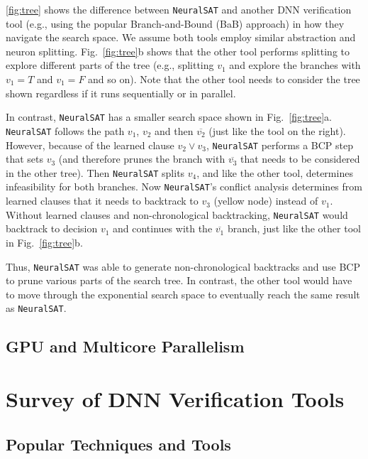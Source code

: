 \documentclass[oneside,11pt,dvipsnames]{book}
\numberwithin{equation}{section}
\theoremstyle{definition}
\theoremstyle{remark}
\newcommand{\tvn}[1]{\iftoggle{usecomment}{{\color{red}{[TVN]: #1}}}{}}
\newcommand{\hd}[1]{\iftoggle{usecomment}{{\color{blue}{[HD]: #1}}}{}}
\newcommand{\tool}{\texttt{NeuralSAT}}
\begin{document}

\autoref{fig:tree} shows the difference between \tool{} and another DNN verification tool (e.g., using the popular Branch-and-Bound (BaB) approach) in how they navigate the search space.  We assume both tools employ similar abstraction and neuron splitting.
Fig.~\ref{fig:tree}b shows that the other tool performs splitting to explore different parts of the tree (e.g., splitting $v_1$ and explore the branches with $v_1=T$ and $v_1=F$ and so on). Note that the other tool needs to consider the tree shown regardless if it runs sequentially or in parallel.

In contrast, \tool{} has a smaller search space shown in Fig.~\ref{fig:tree}a.
\tool{} follows the path $v_1$, $v_2$ and then $\overline{v_2}$ (just like the tool on the right).
However, because of the learned clause $v_2\lor v_3$, \tool{} performs a BCP step that sets $v_3$ (and therefore prunes the branch with $\overline{v_3}$ that needs to be considered in the other tree).
Then \tool{} splits $v_4$, and like the other tool, determines infeasibility for both branches. Now \tool{}'s conflict analysis determines from learned clauses that it needs to backtrack to $v_3$ (yellow node) instead of $v_1$.  Without learned clauses and non-chronological backtracking, \tool{} would backtrack to decision $v_1$ and continues with the $\overline{v_1}$ branch, just like the other tool in Fig.~\ref{fig:tree}b.

Thus, \tool{} was able to generate non-chronological backtracks and use BCP to prune various parts of the search tree.  In contrast, the other tool would have to move through the exponential search space to eventually reach the same result as \tool{}.





\chapter{GPU and Multicore Parallelism}


\part{Survey of DNN Verification Tools}

\chapter{Popular Techniques and Tools}
\end{document}
